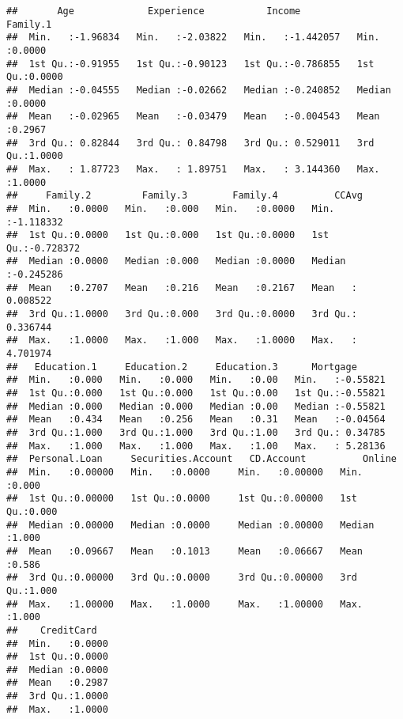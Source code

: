 \documentclass[
]{article}
\begin{document}
\begin{verbatim}
##       Age             Experience           Income             Family.1     
##  Min.   :-1.96834   Min.   :-2.03822   Min.   :-1.442057   Min.   :0.0000  
##  1st Qu.:-0.91955   1st Qu.:-0.90123   1st Qu.:-0.786855   1st Qu.:0.0000  
##  Median :-0.04555   Median :-0.02662   Median :-0.240852   Median :0.0000  
##  Mean   :-0.02965   Mean   :-0.03479   Mean   :-0.004543   Mean   :0.2967  
##  3rd Qu.: 0.82844   3rd Qu.: 0.84798   3rd Qu.: 0.529011   3rd Qu.:1.0000  
##  Max.   : 1.87723   Max.   : 1.89751   Max.   : 3.144360   Max.   :1.0000  
##     Family.2         Family.3        Family.4          CCAvg          
##  Min.   :0.0000   Min.   :0.000   Min.   :0.0000   Min.   :-1.118332  
##  1st Qu.:0.0000   1st Qu.:0.000   1st Qu.:0.0000   1st Qu.:-0.728372  
##  Median :0.0000   Median :0.000   Median :0.0000   Median :-0.245286  
##  Mean   :0.2707   Mean   :0.216   Mean   :0.2167   Mean   : 0.008522  
##  3rd Qu.:1.0000   3rd Qu.:0.000   3rd Qu.:0.0000   3rd Qu.: 0.336744  
##  Max.   :1.0000   Max.   :1.000   Max.   :1.0000   Max.   : 4.701974  
##   Education.1     Education.2     Education.3      Mortgage       
##  Min.   :0.000   Min.   :0.000   Min.   :0.00   Min.   :-0.55821  
##  1st Qu.:0.000   1st Qu.:0.000   1st Qu.:0.00   1st Qu.:-0.55821  
##  Median :0.000   Median :0.000   Median :0.00   Median :-0.55821  
##  Mean   :0.434   Mean   :0.256   Mean   :0.31   Mean   :-0.04564  
##  3rd Qu.:1.000   3rd Qu.:1.000   3rd Qu.:1.00   3rd Qu.: 0.34785  
##  Max.   :1.000   Max.   :1.000   Max.   :1.00   Max.   : 5.28136  
##  Personal.Loan     Securities.Account   CD.Account          Online     
##  Min.   :0.00000   Min.   :0.0000     Min.   :0.00000   Min.   :0.000  
##  1st Qu.:0.00000   1st Qu.:0.0000     1st Qu.:0.00000   1st Qu.:0.000  
##  Median :0.00000   Median :0.0000     Median :0.00000   Median :1.000  
##  Mean   :0.09667   Mean   :0.1013     Mean   :0.06667   Mean   :0.586  
##  3rd Qu.:0.00000   3rd Qu.:0.0000     3rd Qu.:0.00000   3rd Qu.:1.000  
##  Max.   :1.00000   Max.   :1.0000     Max.   :1.00000   Max.   :1.000  
##    CreditCard    
##  Min.   :0.0000  
##  1st Qu.:0.0000  
##  Median :0.0000  
##  Mean   :0.2987  
##  3rd Qu.:1.0000  
##  Max.   :1.0000
\end{verbatim}
\end{document}
